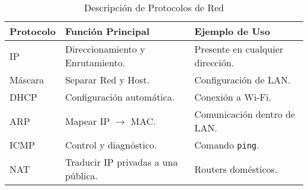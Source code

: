\documentclass[12pt]{amsart}
\begin{document}
\begin{enumerate}
		\begin{table}[h]
		    \centering
		    \begin{tabular}{|l|l|l|}
		        \hline
		        \textbf{Protocolo} & \textbf{Función Principal} & \textbf{Ejemplo de Uso} \\
		        \hline
		        IP & Direccionamiento y Enrutamiento. & Presente en cualquier dirección. \\
		        \hline
		        Máscara & Separar Red y Host. & Configuración de LAN. \\
		        \hline
		        DHCP & Configuración automática. & Conexión a Wi-Fi. \\
		        \hline
		        ARP & Mapear IP $\to$ MAC. & Comunicación dentro de LAN. \\
		        \hline
		        ICMP & Control y diagnóstico. & Comando \texttt{ping}. \\
		        \hline
		        NAT & Traducir IP privadas a una pública. & Routers domésticos. \\
		        \hline
		    \end{tabular}
		   \smallskip
		    \caption{Descripción de Protocolos de Red}
		    \label{tab:protocolos_red}
		\end{table}
		
		\bigskip\bigskip


	\end{enumerate}
	
\end{document}
